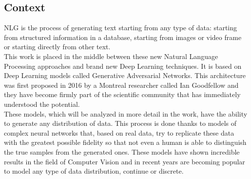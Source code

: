 \subsection{Context}
NLG is the process of generating text starting from any type of data: starting from structured information in a database, starting from images or video frame or starting directly from other text. \\
This work is placed in the middle between these new Natural Language Processing approaches and brand new Deep Learning techniques. It is based on Deep Learning models called Generative Adversarial Networks. This architecture was first proposed in 2016 by a Montreal researcher called Ian Goodfellow \cite{GoodfellowGAN} and they have become firmly part of the scientific community that has immediately understood the potential. \\
These models, which will be analyzed in more detail in the work, have the ability to generate any distribution of data. This process is done thanks to models of complex neural networks that, based on real data, try to replicate these data with the greatest possible fidelity so that not even a human is able to distinguish the true samples from the generated ones. These models have shown incredible results in the field of Computer Vision and in recent years are becoming popular to model any type of data distribution, continue or discrete.

